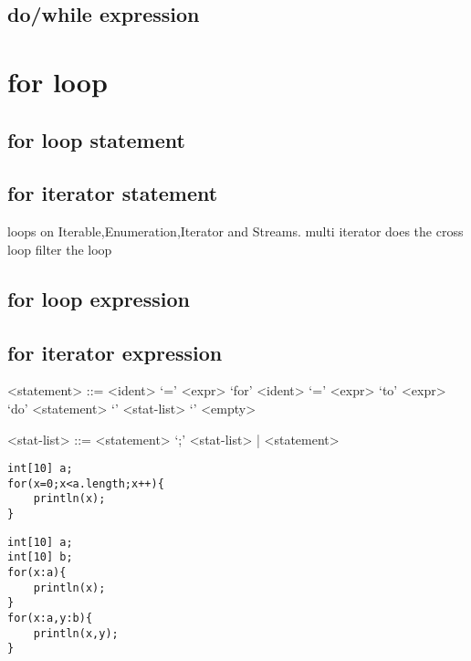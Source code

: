 \documentclass{tufte-book}
\begin{document}
            \subsection{do/while expression}
            \section{for loop}
            \subsection{for loop statement}
            \subsection{for iterator statement}
             loops on Iterable,Enumeration,Iterator and Streams.
             multi iterator does the cross loop
             filter the loop
            \subsection{for loop expression}
            \subsection{for iterator expression}

            \begin{grammar}

            <statement> ::= <ident> `=' <expr> 
            \alt `for' <ident> `=' <expr> `to' <expr> `do' <statement> 
            \alt `{' <stat-list> `}' 
            \alt <empty> 

            <stat-list> ::= <statement> `;' <stat-list> | <statement> 

            \end{grammar}


            \begin{lstlisting}
int[10] a;
for(x=0;x<a.length;x++){
    println(x);
}
            \end{lstlisting}


            \begin{lstlisting}
int[10] a;
int[10] b;
for(x:a){
    println(x);
}
for(x:a,y:b){
    println(x,y);
}
            \end{lstlisting}
\end{document}
